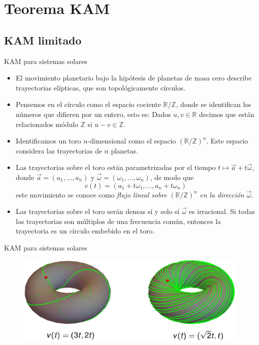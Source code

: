 \documentclass[8pt]{beamer}
\renewcommand{\>}{\rangle}
\newcommand{\<}{\langle}
\newcommand{\be}{\begin{equation}}
\newcommand{\ee}{\end{equation}}
\begin{document}
\section[Teorema KAM]{Teorema KAM}

\subsection[KAM limitado]{KAM limitado}

\begin{frame}{KAM para sistemas solares}
\vspace{-1.0cm}

\begin{itemize}
\item El movimiento planetario bajo la hipótesis de planetas de masa cero describe trayectorias elípticas, que son topológicamente círculos.
\item Pensemos en el círculo como el espacio cociente $\mathbb{R}/\mathbb{Z}$, donde se identifican los números que difieren por un entero, esto es: Dados $u, v \in \mathbb{R}$ decimos que están relacionados módulo $\mathbb{Z}$ si $u-v \in \mathbb{Z}$.
\item Identificamos un toro $n$-dimensional como el espacio $\left(\mathbb{R}/\mathbb{Z}\right)^{n}$. Este espacio considera las trayectorias de $n$ planetas.
\item Las trayectorias sobre el toro están parametrizadas por el tiempo $t \mapsto \vec{a} + t \vec{\omega}$, donde $\vec{a} = (a_{1}, \ldots, a_{n})$ y $\vec{\omega} = (\omega_{1},\ldots , \omega_{n})$, de modo que 
\be 
	v(t) = (a_{1} + t \omega_{1}, \ldots, a_{n} + t \omega_{n})
	\nonumber
\ee
este movimiento se conoce como {\it flujo lineal sobre} $\left(\mathbb{R}/\mathbb{Z}\right)^{n}$ {\it en la dirección} $\vec{\omega}$.
\item Las trayectorias sobre el toro serán densas sí y solo sí $\vec{\omega}$ es irracional. Si todas las trayectorias son múltiplos de una frecuencia común, entonces la trayectoria es un círculo embebido en el toro.
\end{itemize}

\end{frame}

\begin{frame}{KAM para sistemas solares}

\begin{figure}[h]
\centering
\includegraphics[scale=0.35]{toros.eps}
\end{figure}

\end{frame}
\end{document}
